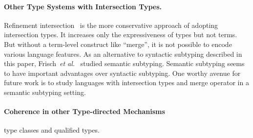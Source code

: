 \paragraph{Other Type Systems with Intersection Types.}

Refinement
intersection~\cite{dunfield2007refined,davies2005practical,freeman1991refinement}
is the more conservative approach of adopting intersection types. It increases
only the expressiveness of types but not terms. But without a term-level
construct like ``merge'', it is not possible to encode various language
features. As an alternative to syntactic subtyping described in this paper,
Frisch~\textit{et al.}~\cite{frisch2008semantic} studied semantic subtyping. Semantic
subtyping seems to have important advantages over syntactic subtyping. One
worthy avenue for future work is to study languages with intersection types
and merge operator in a semantic subtyping setting.


\paragraph{Coherence in other Type-directed Mechanisms} type classes and 
qualified types.

